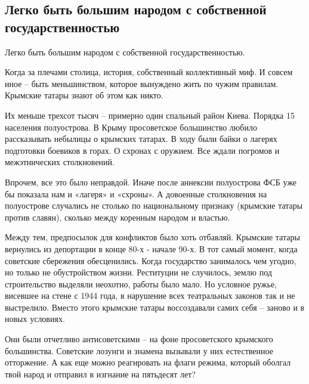  
 
 
 
 

\subsection{Легко быть большим народом с собственной государственностью}
\label{sec:18_05_2021.fb.kazarin_pavel.1.narod_gosudarstvennost}

Легко быть большим народом с собственной государственностью. 

Когда за плечами столица, история, собственный коллективный миф. И совсем иное
– быть меньшинством, которое вынуждено жить по чужим правилам. Крымские татары
знают об этом как никто. 

Их меньше трехсот тысяч – примерно один спальный район Киева. Порядка 15%
населения полуострова. В Крыму просоветское большинство любило рассказывать
небылицы о крымских татарах. В ходу были байки о лагерях подготовки боевиков в
горах. О схронах с оружием. Все ждали погромов и межэтнических столкновений.

Впрочем, все это было неправдой. Иначе после аннексии полуострова ФСБ уже бы
показала нам и «лагеря» и «схроны». А довоенные столкновения на полуострове
случались не столько по национальному признаку (крымские татары против славян),
сколько между коренным народом и властью. 

Между тем, предпосылок для конфликтов было хоть отбавляй. Крымские татары
вернулись из депортации в конце 80-х - начале 90-х. В тот самый момент, когда
советские сбережения обесценились. Когда государство занималось чем угодно, но
только не обустройством жизни. Реституции не случилось, землю под строительство
выделяли неохотно, работы было мало. Но условное ружье, висевшее на стене с
1944 года, в нарушение всех театральных законов так и не выстрелило. Вместо
этого крымские татары воссоздавали самих себя – заново и в новых условиях. 

Они были отчетливо антисоветскими – на фоне просоветского крымского
большинства. Советские лозунги и знамена вызывали у них естественное
отторжение. А как еще можно реагировать на флаги режима, который оболгал твой
народ и отправил в изгнание на пятьдесят лет? 

